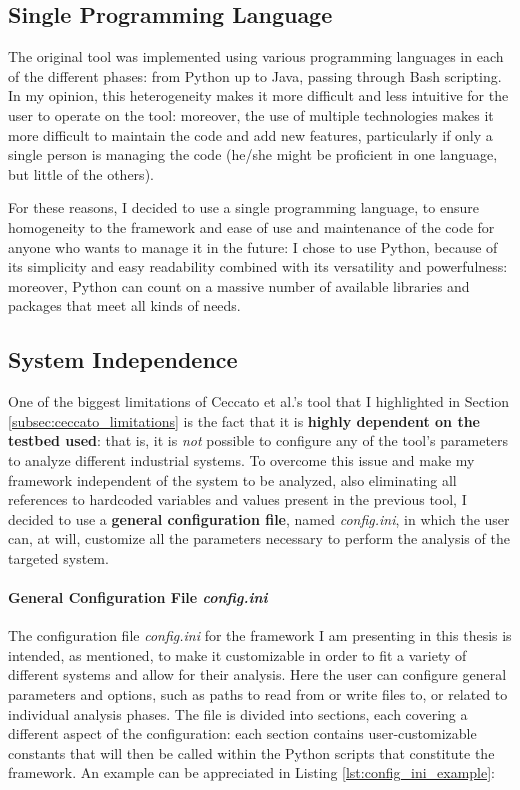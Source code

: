 \subsection{Single Programming Language}
\label{subsec:framewirf_language}
The original tool was implemented using various programming languages in each of the different phases: from Python up to Java, passing through Bash scripting. \newline
In my opinion, this heterogeneity makes it more difficult and less intuitive for the user to operate on the tool: moreover, the use of multiple technologies makes it more difficult to maintain the code and add new features, particularly if only a single person is managing the code (he/she might be proficient in one language, but little of the others).

\bigskip
For these reasons, I decided to use a single programming language, to ensure homogeneity to the framework and ease of use and maintenance of the code for anyone who wants to manage it in the future: I chose to use Python, because of its simplicity and easy readability combined with its versatility and powerfulness: moreover, Python can count on a massive number of available libraries and packages that meet all kinds of needs.

\vfill
\subsection{System Independence}
\label{subsec:framework_independence}
One of the biggest limitations of Ceccato et al.'s tool that I highlighted in Section \ref{subsec:ceccato_limitations} is the fact that it is \textbf{highly dependent on the testbed used}: that is, it is \textit{not} possible to configure any of the tool's parameters to analyze different industrial systems.\newline
To overcome this issue and make my framework independent of the system to be analyzed, also eliminating all references to hardcoded variables and values present in the previous tool, I decided to use a \textbf{general configuration file}, named \textit{config.ini}, in which the user can, at will, customize all the parameters necessary to perform the analysis of the targeted system.

\paragraph{General Configuration File \textit{config.ini}} 
The configuration file \textit{config.ini} for the framework I am presenting in this thesis is intended, as mentioned, to make it customizable in order to fit a variety of different systems and allow for their analysis. Here the user can configure general parameters and options, such as paths to read from or write files to, or related to individual analysis phases.\newline
The file is divided into sections, each covering a different aspect of the configuration: each section contains user-customizable constants that will then be called within the Python scripts that constitute the framework. An example can be appreciated in Listing \ref{lst:config_ini_example}:\newline

